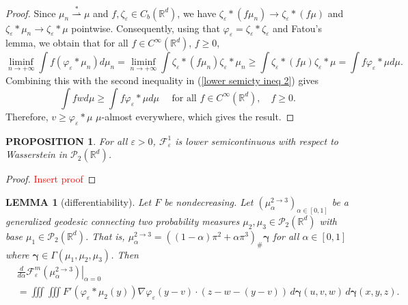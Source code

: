 \documentclass[11pt,leqno]{amsart}
\newtheorem{lem}[thm]{LEMMA}
\newtheorem{prop}[thm]{PROPOSITION}
\theoremstyle{definition}
\newcommand{\R}{{\mathord{\mathbb R}}}
\newcommand{\Rd}{{\mathord{\mathbb R}^d}}
\newcommand{\grad}{\nabla}
\newcommand{\wsto}{\stackrel{*}{\rightharpoonup}}
\newcommand{\F}{\mathcal{F}}
\def\P{{\mathcal P}}
\def\e{\varepsilon}
\newcommand{\bgamma}{\boldsymbol{\gamma}}
\def\F{\mathcal{F}}
\begin{document}
\begin{proof}
Since $\mu_n \wsto \mu$ and $f, \zeta_\e \in C_b(\Rd)$, we have $\zeta_\e*( f \mu_n) \to \zeta_\e*( f \mu)$ and $\zeta_\e*\mu_n \to \zeta_\e *\mu$ pointwise.
Consequently, using that $\varphi_\e = \zeta_\e *\zeta_\e$ and Fatou's lemma, we obtain that for all $f \in C^\infty(\Rd)$, $f \geq 0$, 
\[ \liminf_{n \to +\infty} \int f (\varphi_\e *\mu_n) d \mu_n = \liminf_{n \to +\infty} \int \zeta_\e*( f \mu_n) \zeta_\e*\mu_n \geq \int \zeta_\e *(f \mu) \zeta_\e *\mu = \int f \varphi_\e* \mu d \mu .\]
Combining this with the second inequality in (\ref{lower semicty ineq 2}) gives
\[ \int f w d \mu \geq \int f \varphi_\e* \mu d \mu \quad \text{ for all } f \in C^\infty(\Rd), \quad f \geq 0 .\]
Therefore, $v \geq \varphi_\e* \mu$ $\mu$-almost everywhere, which gives the result.
\end{proof}

\begin{prop} \label{lscm1}
For all $\e >0$, $\F^1_\e$ is lower semicontinuous with respect to Wasserstein in $\P_2(\Rd)$.
\end{prop}

\begin{proof}
\textcolor{red}{Insert  proof}
\end{proof}

\begin{lem}[differentiability] \label{diff lem}
	Let $F$ be nondecreasing. Let $(\mu_\alpha^{2\to3})_{\alpha\in[0,1]}$ be a generalized geodesic connecting two probability measures $\mu_2,\mu_3\in\P_2(\R^d)$ with base $\mu_1\in\P_2(\R^d)$. That is, $\mu_\alpha^{2\to3} = \left((1-\alpha)\pi^2+\alpha\pi^3\right)_\# \bgamma$ for all $\alpha \in[0,1]$ where $\bgamma\in\Gamma(\mu_1,\mu_2,\mu_3)$. Then
\begin{equation} \label{diff lem eqn} 
	\begin{split}
		&\left. \frac{d}{d \alpha } \F^m_\e(\mu_\alpha^{2\to3}) \right|_{\alpha = 0}\\
		&=\iiint \iiint F'\left(\varphi_\e*\mu_2(y) \right) \grad \varphi_\e(y-v) \cdot (z-w-(y-v)) \,d \bgamma(u,v,w)\, d \bgamma(x,y,z). 
	\end{split}
\end{equation}
\end{lem}
\end{document}
